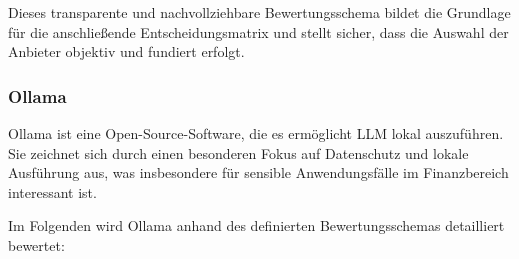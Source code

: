     Dieses transparente und nachvollziehbare Bewertungsschema bildet die Grundlage für die anschließende Entscheidungsmatrix und stellt sicher, dass die Auswahl der Anbieter objektiv und fundiert erfolgt.

    \subsubsection{Ollama}

      Ollama ist eine Open-Source-Software, die es ermöglicht \acs{LLM} lokal auszuführen.
      Sie zeichnet sich durch einen besonderen Fokus auf Datenschutz und lokale Ausführung aus, was insbesondere für sensible Anwendungsfälle im Finanzbereich interessant ist.

      Im Folgenden wird Ollama anhand des definierten Bewertungsschemas detailliert bewertet:
